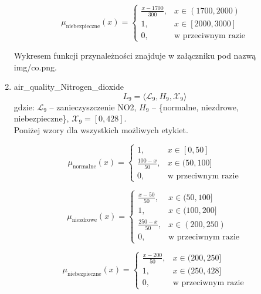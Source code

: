 \documentclass{article}
\begin{document}
\begin{enumerate}
    \begin{equation}
    \mu_{\text{niebezpieczne}}(x) =
    \begin{cases}
    \frac{x - 1700}{300}, & x \in (1700, 2000) \\
    1, & x \in [2000, 3000] \\
    0, & \text{w przeciwnym razie}
    \end{cases}
    \end{equation}

Wykresem funkcji przynależności znajduje w załączniku pod nazwą img/co.png.
    
    \item air\_quality\_Nitrogen\_dioxide
                \begin{equation}
            L_9 = \langle \mathcal{L}_9, H_9, \mathcal{X}_9 \rangle
        \end{equation}
        gdzie: $\mathcal{L}_9$ – zanieczyszczenie NO2, $H_9$ – \{normalne, niezdrowe, niebezpieczne\}, $\mathcal{X}_9 = [0, 428]$. \\
        Poniżej wzory dla wszystkich możliwych etykiet.

    \begin{equation}
    \mu_{\text{normalne}}(x) =
    \begin{cases}
    1, & x \in [0, 50] \\
    \frac{100 - x}{50}, & x \in (50, 100] \\
    0, & \text{w przeciwnym razie}
    \end{cases}
    \end{equation}
    
    \begin{equation}
    \mu_{\text{niezdrowe}}(x) =
    \begin{cases}
    \frac{x - 50}{50}, & x \in (50, 100] \\
    1, & x \in (100, 200] \\
    \frac{250 - x}{50}, & x \in (200, 250) \\
    0, & \text{w przeciwnym razie}
    \end{cases}
    \end{equation}
    
    \begin{equation}
    \mu_{\text{niebezpieczne}}(x) =
    \begin{cases}
    \frac{x - 200}{50}, & x \in (200, 250] \\
    1, & x \in (250, 428] \\
    0, & \text{w przeciwnym razie}
    \end{cases}
    \end{equation}


\end{enumerate}
\end{document}
